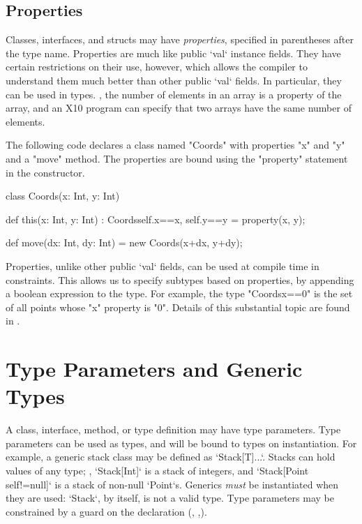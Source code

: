 \subsection{Properties}
\label{properties}

Classes, interfaces, and structs may have {\em properties}, specified in
parentheses after the type name. Properties are much like public \xcd`val`
instance fields. They have certain restrictions on their use, however, which
allows the compiler to understand them much better than other public \xcd`val`
fields. In particular, they can be used in types.  \Eg, the number of elements
in an array is a property of the array, and an X10 program can specify that
two arrays have the same number of elements.

\begin{ex}
The
following code declares a class named \xcd"Coords" with properties
\xcd"x" and \xcd"y" and a \xcd"move" method. The properties are bound
using the \xcd"property" statement in the constructor.

\begin{xten}
class Coords(x: Int, y: Int) { 
  def this(x: Int, y: Int) :
    Coords{self.x==x, self.y==y} = { 
    property(x, y); 
  } 

  def move(dx: Int, dy: Int) = new Coords(x+dx, y+dy); 
}
\end{xten}
\end{ex}
Properties, unlike other public \xcd`val` fields, can be used  
at compile time in {constraints}. This allows us
to specify subtypes based on properties, by appending a boolean expression to
the type. For example, the type \xcd"Coords{x==0}" is the set of all points
whose \xcd"x" property is \xcd"0".  Details of this substantial topic are
found in .



\section{Type Parameters and Generic Types}
\label{TypeParameters}

\label{Generics}

A class, interface, method, or type definition  may have type
parameters.  Type parameters can be used as types, and will be bound to types
on instantiation.  For example, a generic stack class may be defined as 
\xcd`Stack[T]{...}`.  Stacks can hold values of any type; \eg, 
\xcd`Stack[Int]` is a stack of integers, and 
\xcd`Stack[Point {self!=null}]` is a stack of non-null \xcd`Point`s.
Generics {\em must} be instantiated when they are used: \xcd`Stack`, by
itself, is not a valid type.
Type parameters may be constrained by a guard on the declaration
(,
,).

